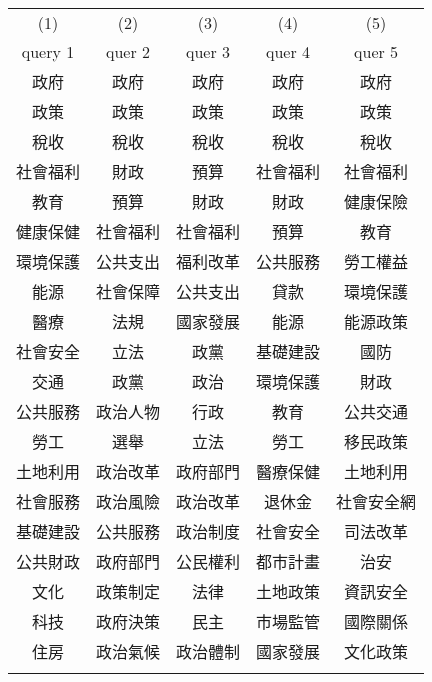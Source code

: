 {
\def\sym#1{\ifmmode^{#1}\else\(^{#1}\)\fi}
\begin{tabular}{c c c c c}
\hline\hline

\multicolumn{1}{c}{(1)}
&\multicolumn{1}{c}{(2)}
&\multicolumn{1}{c}{(3)}
&\multicolumn{1}{c}{(4)}
&\multicolumn{1}{c}{(5)}
\\

\multicolumn{1}{c}{query 1}
&\multicolumn{1}{c}{quer 2}
&\multicolumn{1}{c}{quer 3}
&\multicolumn{1}{c}{quer 4}
&\multicolumn{1}{c}{quer 5}
\\
\hline
政府 & 政府 & 政府 & 政府 & 政府 \\
政策 & 政策 & 政策 & 政策 & 政策 \\
稅收 & 稅收 & 稅收 & 稅收 & 稅收 \\
社會福利 & 財政 & 預算 & 社會福利 & 社會福利 \\
教育 & 預算 & 財政 & 財政 & 健康保險 \\
健康保健 & 社會福利 & 社會福利 & 預算 & 教育 \\
環境保護 & 公共支出 & 福利改革 & 公共服務 & 勞工權益 \\
能源 & 社會保障 & 公共支出 & 貸款 & 環境保護 \\
醫療 & 法規 & 國家發展 & 能源 & 能源政策 \\
社會安全 & 立法 & 政黨 & 基礎建設 & 國防 \\
交通 & 政黨 & 政治 & 環境保護 & 財政 \\
公共服務 & 政治人物 & 行政 & 教育 & 公共交通 \\
勞工 & 選舉 & 立法 & 勞工 & 移民政策 \\
土地利用 & 政治改革 & 政府部門 & 醫療保健 & 土地利用 \\
社會服務 & 政治風險 & 政治改革 & 退休金 & 社會安全網 \\
基礎建設 & 公共服務 & 政治制度 & 社會安全 & 司法改革 \\
公共財政 & 政府部門 & 公民權利 & 都市計畫 & 治安 \\
文化 & 政策制定 & 法律 & 土地政策 & 資訊安全 \\
科技 & 政府決策 & 民主 & 市場監管 & 國際關係 \\
住房 & 政治氣候 & 政治體制 & 國家發展 & 文化政策 \\
\\
\hline\hline
\end{tabular}
}
